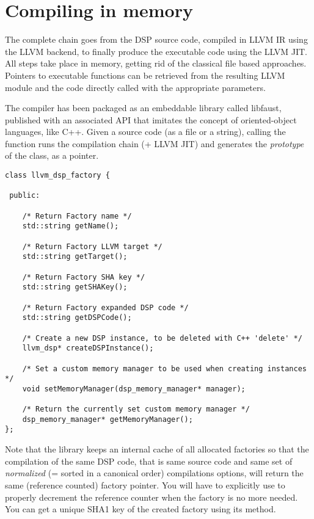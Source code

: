 \section{Compiling in memory}

The complete chain goes from the \faust DSP source code, compiled in LLVM IR using the LLVM backend, to finally produce the executable code using the LLVM JIT. All steps take place in memory, getting rid of the classical file based approaches. Pointers to executable functions can be retrieved from the resulting LLVM module and the code directly called with the appropriate parameters.

The \faust compiler has been packaged as an embeddable library called libfaust, published with an associated API that imitates the concept of oriented-object languages, like C++. Given a \faust source code (as a file or a string), calling the  function runs the compilation chain (\faust + LLVM JIT) and generates the {\it prototype} of the class, as a  pointer.

\begin{lstlisting}
class llvm_dsp_factory {

 public: 
    
    /* Return Factory name */
    std::string getName();
    
    /* Return Factory LLVM target */
    std::string getTarget();
    
    /* Return Factory SHA key */
    std::string getSHAKey();

    /* Return Factory expanded DSP code */
    std::string getDSPCode();
    
    /* Create a new DSP instance, to be deleted with C++ 'delete' */
    llvm_dsp* createDSPInstance();

    /* Set a custom memory manager to be used when creating instances */
    void setMemoryManager(dsp_memory_manager* manager);

    /* Return the currently set custom memory manager */
    dsp_memory_manager* getMemoryManager();
};

\end{lstlisting}

Note that the library keeps an internal cache of all allocated factories so that the compilation of the same DSP code, that is same source code and same set of {\it normalized} (= sorted in a canonical order) compilations options, will return the same (reference counted) factory pointer. You will have to explicitly use  to properly decrement the reference counter when the factory is no more needed. You can get a unique SHA1 key of the created factory using its  method.

